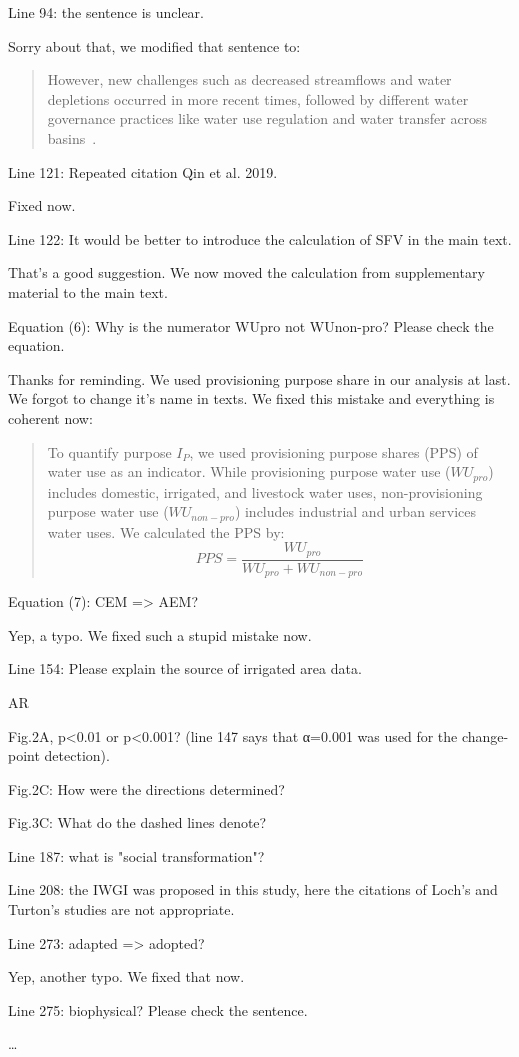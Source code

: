 \RC{} Line 94: the sentence is unclear.

\AR{} Sorry about that, we modified that sentence to:

\begin{quote}
	However, new challenges such as decreased streamflows and water depletions occurred in more recent times, followed by different water governance practices like water use regulation and water transfer across basins~\cite{wang2019c}.
\end{quote}

\RC{} Line 121: Repeated citation Qin et al. 2019.

\AR{} Fixed now.

\RC{} Line 122: It would be better to introduce the calculation of SFV in the main text.

\AR{} That's a good suggestion. We now moved the calculation from supplementary material to the main text.

\RC{} Equation (6): Why is the numerator WUpro not WUnon-pro? Please check the equation.

\AR{} Thanks for reminding. We used provisioning purpose share in our analysis at last. We forgot to change it's name in texts. We fixed this mistake and everything is coherent now:

\begin{quote}
	To quantify purpose $I_P$, we used provisioning purpose shares (PPS) of water use as an indicator. While provisioning purpose water use ($WU_{pro}$) includes domestic, irrigated, and livestock water uses, non-provisioning purpose water use ($WU_{non-pro}$) includes industrial and urban services water uses. We calculated the PPS by:
	\begin{equation}
		PPS = \frac{WU_{pro}}{WU_{pro} + WU_{non-pro}}
	\end{equation}
\end{quote}

\RC{} Equation (7): CEM => AEM?\

\AR{} Yep, a typo. We fixed such a stupid mistake now.

\RC{} Line 154: Please explain the source of irrigated area data.

AR{}

\RC{} Fig.2A, p<0.01 or p<0.001? (line 147 says that α=0.001 was used for the change-point detection).

\RC{} Fig.2C: How were the directions determined?

\RC{} Fig.3C: What do the dashed lines denote?

\RC{} Line 187: what is "social transformation"?

\RC{} Line 208: the IWGI was proposed in this study, here the citations of Loch's and Turton's studies are not appropriate.

\RC{} Line 273: adapted => adopted?

\AR{} Yep, another typo. We fixed that now.

\RC{} Line 275: biophysical? Please check the sentence.

\AR{} \dots
